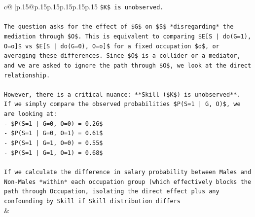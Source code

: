 \documentclass{article}
\begin{document}
{\begin{supertabular}{c@{$\;$}|p{.15\linewidth}@{}p{.15\linewidth}p{.15\linewidth}p{.15\linewidth}p{.15\linewidth}p{.15\linewidth}}
{{{\texttt{\$K\$ is unobserved.} \\
\\ 
\texttt{The question asks for the effect of \$G\$ on \$S\$ *disregarding* the mediation through \$O\$. This is equivalent to comparing \$E{[}S | do(G=1), O=o{]}\$ vs \$E{[}S | do(G=0), O=o{]}\$ for a fixed occupation \$o\$, or averaging these differences. Since \$O\$ is a collider or a mediator, and we are asked to ignore the path through \$O\$, we look at the direct relationship.} \\
\\ 
\texttt{However, there is a critical nuance: **Skill (\$K\$) is unobserved**.} \\
\texttt{If we simply compare the observed probabilities \$P(S=1 | G, O)\$, we are looking at:} \\
\texttt{{-} \$P(S=1 | G=0, O=0) = 0.26\$} \\
\texttt{{-} \$P(S=1 | G=0, O=1) = 0.61\$} \\
\texttt{{-} \$P(S=1 | G=1, O=0) = 0.55\$} \\
\texttt{{-} \$P(S=1 | G=1, O=1) = 0.68\$} \\
\\ 
\texttt{If we calculate the difference in salary probability between Males and Non{-}Males *within* each occupation group (which effectively blocks the path through Occupation, isolating the direct effect plus any confounding by Skill if Skill distribution differs} \\
            }
        }
    }
    & \\ \\


\end{supertabular}}
\end{document}
